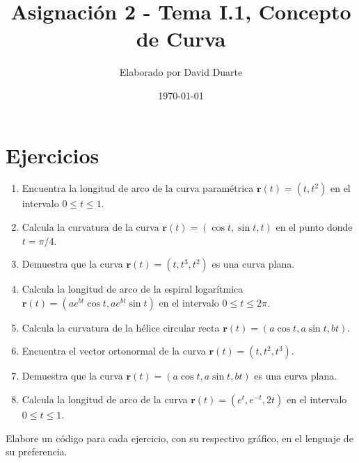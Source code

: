 \documentclass{article}
\title{Asignación 2 -  Tema I.1, Concepto de Curva}
\author{Elaborado por David Duarte}
\date{\today}
\begin{document}
	\maketitle
	
	\section*{Ejercicios}
	
	\begin{enumerate}
		\item Encuentra la longitud de arco de la curva paramétrica $\mathbf{r}(t) = (t, t^2)$ en el intervalo $0 \leq t \leq 1$.
		\item Calcula la curvatura de la curva $\mathbf{r}(t) = (\cos t, \sin t, t)$ en el punto donde $t = \pi/4$.
		\item Demuestra que la curva $\mathbf{r}(t) = (t, t^3, t^2)$ es una curva plana.
		\item Calcula la longitud de arco de la espiral logarítmica $\mathbf{r}(t) = (ae^{bt}\cos t, ae^{bt}\sin t)$ en el intervalo $0 \leq t \leq 2\pi$.
		
		\item Calcula la curvatura de la hélice circular recta $\mathbf{r}(t) = (a\cos t, a\sin t, bt)$.
		\item Encuentra el vector ortonormal de la curva $\mathbf{r}(t) = (t, t^2, t^3)$.
		\item Demuestra que la curva $\mathbf{r}(t) = (a\cos t, a\sin t, bt)$ es una curva plana.
		\item Calcula la longitud de arco de la curva $\mathbf{r}(t) = (e^t, e^{-t}, 2t)$ en el intervalo $0 \leq t \leq 1$.
	\end{enumerate}
	Elabore un código para cada ejercicio, con su respectivo gráfico, en el lenguaje de su preferencia.
\end{document}
